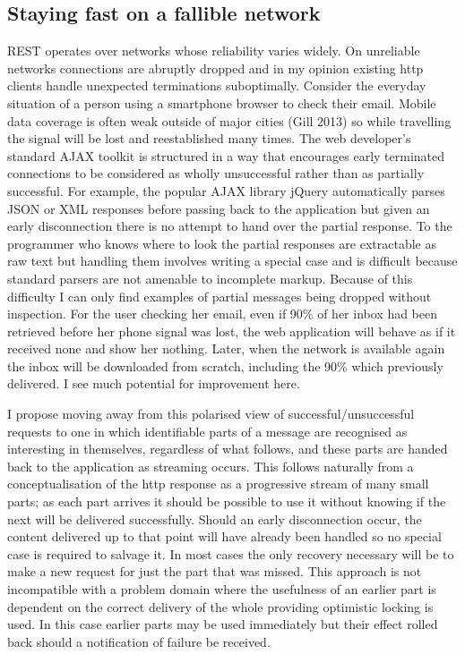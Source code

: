 \documentclass[]{article}
\begin{document}
\subsection{Staying fast on a fallible network}

REST operates over networks whose reliability varies widely. On
unreliable networks connections are abruptly dropped and in my opinion
existing http clients handle unexpected terminations suboptimally.
Consider the everyday situation of a person using a smartphone browser
to check their email. Mobile data coverage is often weak outside of
major cities (Gill 2013) so while travelling the signal will be lost and
reestablished many times. The web developer's standard AJAX toolkit is
structured in a way that encourages early terminated connections to be
considered as wholly unsuccessful rather than as partially successful.
For example, the popular AJAX library jQuery automatically parses JSON
or XML responses before passing back to the application but given an
early disconnection there is no attempt to hand over the partial
response. To the programmer who knows where to look the partial
responses are extractable as raw text but handling them involves writing
a special case and is difficult because standard parsers are not
amenable to incomplete markup. Because of this difficulty I can only
find examples of partial messages being dropped without inspection. For
the user checking her email, even if 90\% of her inbox had been
retrieved before her phone signal was lost, the web application will
behave as if it received none and show her nothing. Later, when the
network is available again the inbox will be downloaded from scratch,
including the 90\% which previously delivered. I see much potential for
improvement here.

I propose moving away from this polarised view of
successful/unsuccessful requests to one in which identifiable parts of a
message are recognised as interesting in themselves, regardless of what
follows, and these parts are handed back to the application as streaming
occurs. This follows naturally from a conceptualisation of the http
response as a progressive stream of many small parts; as each part
arrives it should be possible to use it without knowing if the next will
be delivered successfully. Should an early disconnection occur, the
content delivered up to that point will have already been handled so no
special case is required to salvage it. In most cases the only recovery
necessary will be to make a new request for just the part that was
missed. This approach is not incompatible with a problem domain where
the usefulness of an earlier part is dependent on the correct delivery
of the whole providing optimistic locking is used. In this case earlier
parts may be used immediately but their effect rolled back should a
notification of failure be received.
\end{document}
